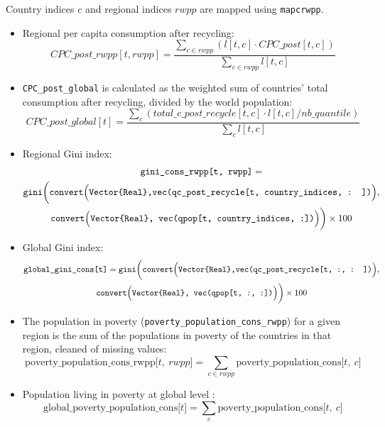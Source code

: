 \documentclass[
]{article}
\begin{document}
Country indices \(c\) and regional indices \(rwpp\) are mapped using
\texttt{mapcrwpp}.

\begin{itemize}
\item
  Regional per capita consumption after recycling:
  \begin{equation}
  CPC\_post\_rwpp[t, rwpp] = \frac{\sum_{c \in rwpp} (l[t, c] \cdot CPC\_post[t, c])}{\sum_{c \in rwpp} l[t, c]}
  \end{equation}
\item
  \texttt{CPC\_post\_global} is calculated as the weighted sum of
  countries' total consumption after recycling, divided by the world
  population:
  \begin{equation}
  CPC\_post\_global[t] = \frac{\sum_c (total\_c\_post\_recycle[t, c] \cdot l[t, c] / nb\_quantile)}{\sum_c l[t, c]}
  \end{equation}
\item
  Regional Gini index: 
  \begin{multline} 
    \texttt{gini\_cons\_rwpp[t,\ rwpp]} = \\
    \texttt{gini} \biggl( \texttt{convert} \Bigl( \texttt{Vector\{Real\},} \texttt{vec(qc\_post\_recycle[t,\ country\_indices,\ : ])} \Bigr), \\
    \texttt{convert} \Bigl( \texttt{Vector\{Real\},\ vec(qpop[t,\ country\_indices,\ :])} \Bigr) \biggr) \times 100
    \end{multline}

\item
  Global Gini index: 
  \begin{multline} 
    \texttt{global\_gini\_cons{[}t{]}} = \texttt{gini} \biggl( \texttt{convert} \Bigl( \texttt{Vector\{Real\},} \texttt{vec(qc\_post\_recycle[t,\ :,\ : ])} \Bigr), \\
    \texttt{convert} \Bigl( \texttt{Vector\{Real\},\ vec(qpop[t,\ :,\ :])} \Bigr) \biggr) \times 100
    \end{multline}

\item
  The population in poverty (\texttt{poverty\_population\_cons\_rwpp})
  for a given region is the sum of the populations in poverty of the
  countries in that region, cleaned of missing values:
  \begin{equation}
  \text{poverty\_population\_cons\_rwpp}{[}t,\ rwpp{]} = \sum_{c \in rwpp} \text{poverty\_population\_cons}{[}t,\ c{]}
  \end{equation}

\item
  Population living in poverty at global level :
  \begin{equation}
    \text{global\_poverty\_population\_cons}{[}t{]} = \sum_{c} \text{poverty\_population\_cons}{[}t,\ c{]}
    \end{equation}
\end{itemize}
\end{document}
